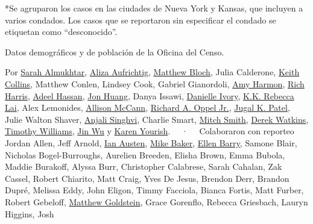 *Se agruparon los casos en las ciudades de Nueva York y Kansas, que
incluyen a varios condados. Los casos que se reportaron sin especificar
el condado se etiquetan como ``desconocido''.

Datos demográficos y de población de la Oficina del Censo.

Por \href{https://www.nytimes3xbfgragh.onion/by/sarah-almukhtar}{Sarah
Almukhtar},
\href{https://www.nytimes3xbfgragh.onion/by/aliza-aufrichtig}{Aliza
Aufrichtig},
\href{https://www.nytimes3xbfgragh.onion/by/matthew-bloch}{Matthew
Bloch}, Julia Calderone,
\href{https://www.nytimes3xbfgragh.onion/by/keith-collins}{Keith
Collins}, Matthew Conlen, Lindsey Cook, Gabriel Gianordoli,
\href{https://www.nytimes3xbfgragh.onion/by/amy-harmon}{Amy Harmon},
\href{https://www.nytimes3xbfgragh.onion/by/rich-harris}{Rich Harris},
\href{https://www.nytimes3xbfgragh.onion/by/adeel-hassan}{Adeel Hassan},
\href{https://www.nytimes3xbfgragh.onion/by/jon-huang}{Jon Huang}, Danya
Issawi,
\href{https://www.nytimes3xbfgragh.onion/by/danielle-ivory}{Danielle
Ivory}, \href{https://www.nytimes3xbfgragh.onion/by/kk-rebecca-lai}{K.K.
Rebecca Lai}, Alex Lemonides,
\href{https://www.nytimes3xbfgragh.onion/by/allison-mccann}{Allison
McCann},
\href{https://www.nytimes3xbfgragh.onion/by/richard-a-oppel-jr}{Richard
A. Oppel Jr.},
\href{https://www.nytimes3xbfgragh.onion/by/jugal-k-patel}{Jugal K.
Patel}, Julie Walton Shaver,
\href{https://www.nytimes3xbfgragh.onion/by/anjali-singhvi}{Anjali
Singhvi}, Charlie Smart,
\href{https://www.nytimes3xbfgragh.onion/by/mitch-smith}{Mitch Smith},
\href{https://www.nytimes3xbfgragh.onion/by/derek-watkins}{Derek
Watkins},
\href{https://www.nytimes3xbfgragh.onion/by/timothy-williams}{Timothy
Williams}, \href{https://www.nytimes3xbfgragh.onion/by/jin-wu}{Jin Wu} y
\href{https://www.nytimes3xbfgragh.onion/by/karen-yourish}{Karen
Yourish}. ~~·~~ Colaboraron con reporteo Jordan Allen, Jeff Arnold,
\href{https://www.nytimes3xbfgragh.onion/by/ian-austen}{Ian Austen},
\href{https://www.nytimes3xbfgragh.onion/by/mike-baker}{Mike Baker},
\href{https://www.nytimes3xbfgragh.onion/by/ellen-barry}{Ellen Barry},
Samone Blair, Nicholas Bogel-Burroughs, Aurelien Breeden, Elisha Brown,
Emma Bubola, Maddie Burakoff, Alyssa Burr, Christopher Calabrese, Sarah
Cahalan, Zak Cassel, Robert Chiarito, Matt Craig, Yves De Jesus, Brendon
Derr, Brandon Dupré, Melissa Eddy, John Eligon, Timmy Facciola, Bianca
Fortis, Matt Furber, Robert Gebeloff,
\href{https://www.nytimes3xbfgragh.onion/by/matthew-goldstein}{Matthew
Goldstein}, Grace Gorenflo, Rebecca Griesbach, Lauryn Higgins, Josh
